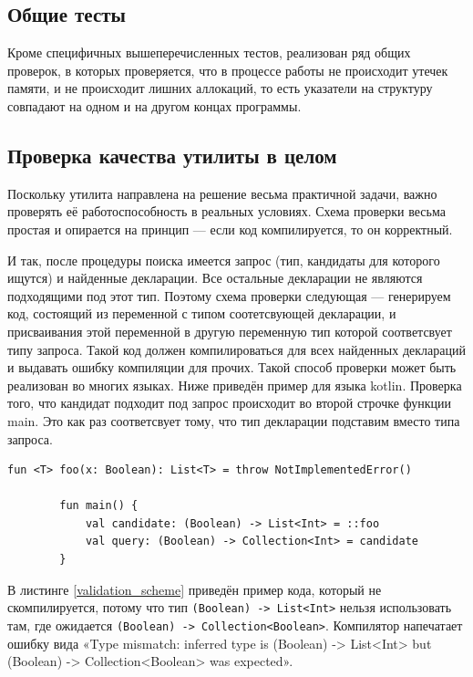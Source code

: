 \documentclass[times]{itmo-student-thesis}
\begin{document}
	\subsection{Общие тесты}
	Кроме специфичных вышеперечисленных тестов, реализован ряд общих проверок, в которых проверяется, что в процессе работы не происходит утечек памяти, и не происходит лишних аллокаций, то есть указатели на структуру совпадают на одном и на другом концах программы.
	
	\subsection{Проверка качества утилиты в целом}\label{e2etests}
	Поскольку утилита направлена на решение весьма практичной задачи, важно проверять её работоспособность в реальных условиях. Схема проверки весьма простая и опирается на принцип --- если код компилируется, то он корректный.
	
	И так, после процедуры поиска имеется запрос (тип, кандидаты для которого ищутся) и найденные декларации. Все остальные декларации не являются подходящими под этот тип. Поэтому схема проверки следующая --- генерируем код, состоящий из  переменной с типом соотетсвующей декларации, и присваивания этой переменной в другую переменную тип которой соответсвует типу запроса. Такой код должен компилироваться для всех найденных деклараций и выдавать ошибку компиляции для прочих. Такой способ проверки может быть реализован во многих языках. Ниже приведён пример для языка kotlin. Проверка того, что кандидат подходит под запрос происходит во второй строчке функции main. Это как раз соответсвует тому, что тип декларации подставим вместо типа запроса.
	
	\begin{lstlisting}[caption={Схема валидации решения для языка kotlin},label={validation_scheme}]
		fun <T> foo(x: Boolean): List<T> = throw NotImplementedError()
		
		fun main() {
			val candidate: (Boolean) -> List<Int> = ::foo
			val query: (Boolean) -> Collection<Int> = candidate
		}
	\end{lstlisting}
	
	В листинге \ref{validation_scheme} приведён пример кода, который не скомпилируется, потому что тип \lstinline{(Boolean) -> List<Int>} нельзя использовать там, где ожидается \lstinline{(Boolean) -> Collection<Boolean>}. Компилятор напечатает ошибку вида «Type mismatch: inferred type is (Boolean) -> List<Int> but (Boolean) -> Collection<Boolean> was expected».
	
\end{document}
